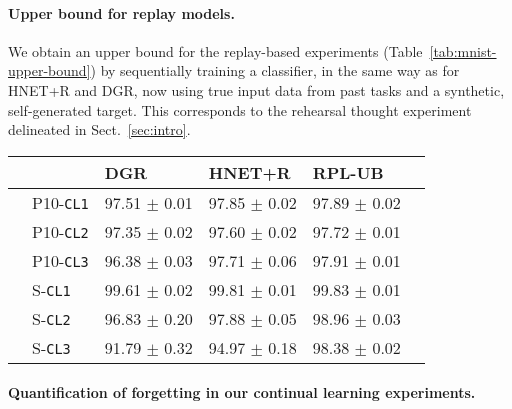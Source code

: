 \documentclass{article}
\begin{document}
\paragraph{Upper bound for replay models.} We obtain an upper bound for the replay-based experiments (Table~\ref{tab:mnist-upper-bound}) by sequentially training a classifier, in the same way as for HNET+R and DGR, now using true input data from past tasks and a synthetic, self-generated target. This corresponds to the rehearsal thought experiment delineated in Sect.~\ref{sec:intro}.
\begin{table*}[ht!]
 \centering
  \caption{Task-averaged test accuracy ($\pm$ SEM, $n=20$) on the permuted (`P10') and split (`S') MNIST experiments. For HNET+R and DGR+distill \citep{van_de_ven_three_2019} the classification network is trained sequentially on data from the current task and replayed data from all previous tasks. Our HNET+R comes close to saturating the corresponding replay upper bound RPL-UB.}
  \begin{small}
  \begin{tabular}{llp{1.62cm}p{1.62cm}p{1.65cm}p{1.65cm}} \toprule
     & & \textbf{DGR} & \textbf{HNET+R} & \textbf{RPL-UB} \\ \midrule \midrule
    \multirow{3}{*}{}
    & P10-\texttt{CL1} & 97.51 $\pm$  0.01 & 97.85 $\pm$  0.02 & 97.89 $\pm$  0.02 \\
        &  P10-\texttt{CL2} & 97.35 $\pm$  0.02& 97.60 $\pm$  0.02 & 97.72 $\pm$  0.01\\
    & P10-\texttt{CL3} & 96.38 $\pm$  0.03 & 97.71 $\pm$  0.06 & 97.91 $\pm$  0.01\\
    \midrule
    \multirow{3}{*}{} 
    & S-\texttt{CL1} &  99.61 $\pm$  0.02 & 99.81 $\pm$  0.01 & 99.83 $\pm$  0.01 \\
    & S-\texttt{CL2} &  96.83 $\pm$  0.20 & 97.88 $\pm$  0.05 & 98.96 $\pm$  0.03 \\
    & S-\texttt{CL3} &  91.79 $\pm$  0.32 & 94.97 $\pm$  0.18 & 98.38 $\pm$  0.02 \\
    \bottomrule
  \end{tabular}
  \label{tab:mnist-upper-bound}
  \end{small}
\end{table*}

\paragraph{Quantification of forgetting in our continual learning experiments.}
\end{document}
